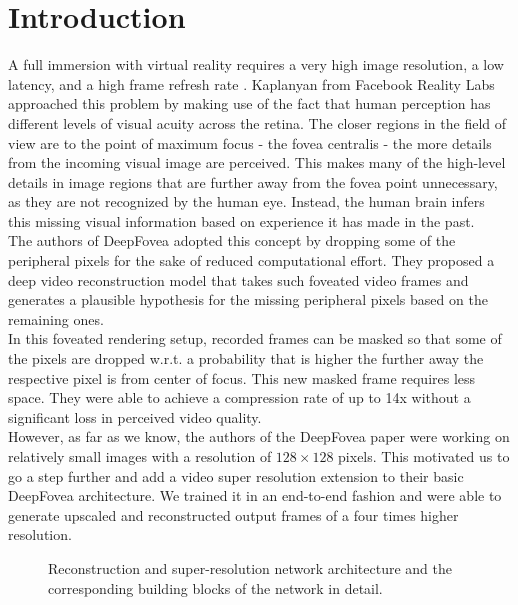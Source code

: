 \documentclass[10pt,twocolumn,letterpaper]{article}
\begin{document}
	\section{Introduction} \label{sec:introduction}
	A full immersion with virtual reality requires a very high image resolution, a low latency, and a high frame refresh rate \cite{deepfovea}. Kaplanyan \etal \cite{deepfovea} from Facebook Reality Labs approached this problem by making use of the fact that human perception has different levels of visual acuity across the retina. The closer regions in the field of view are to the point of maximum focus - the fovea centralis - the more details from the incoming visual image are perceived. This makes many of the high-level details in image regions that are further away from the fovea point unnecessary, as they are not recognized by the human eye. Instead, the human brain infers this missing visual information based on experience it has made in the past.\\
	The authors of DeepFovea \cite{deepfovea} adopted this concept by dropping some of the peripheral pixels for the sake of reduced computational effort. They proposed a deep video reconstruction model that takes such foveated video frames and generates a plausible hypothesis for the missing peripheral pixels based on the remaining ones.\\
	In this foveated rendering setup, recorded frames can be masked so that some of the pixels are dropped w.r.t. a probability that is higher the further away the respective pixel is from center of focus. This new masked frame requires less space. They were able to achieve a compression rate of up to 14x without a significant loss in perceived video quality.\\
	However, as far as we know, the authors of the DeepFovea paper were working on relatively small images with a resolution of $128\times 128$ pixels. This motivated us to go a step further and add a video super resolution extension to their basic DeepFovea architecture. We trained it in an end-to-end fashion and were able to generate upscaled and reconstructed output frames of a four times higher resolution.\\
	
	\begin{figure}[htbp!]
		\centering
		
		\caption{Reconstruction and super-resolution network architecture and the corresponding building blocks of the network in detail.}
		\label{fig:reconstructionnetwork}
	\end{figure}
	
\end{document}

